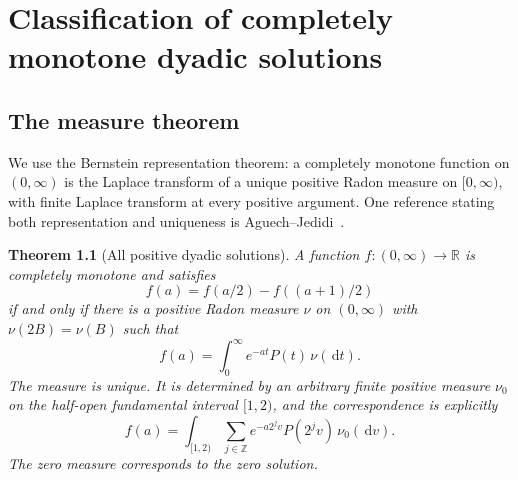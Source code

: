 \documentclass[11pt,a4paper,oneside,openany]{book}
\numberwithin{equation}{chapter}
\newtheorem{theorem}{Theorem}[chapter]
\theoremstyle{definition}
\theoremstyle{remark}
\newcommand{\Z}{\mathbb Z}
\newcommand{\R}{\mathbb R}
\newcommand{\dd}{\,\mathrm d}
\begin{document}
\chapter{Classification of completely monotone dyadic solutions}\label{ra:sec:classification}

\section{The measure theorem}
We use the Bernstein representation theorem: a completely monotone
function on $(0,\infty)$ is the Laplace transform of a unique positive
Radon measure on $[0,\infty)$, with finite Laplace transform at every
positive argument. One reference stating both representation and uniqueness
is Aguech--Jedidi~\cite[Theorem~1]{aguech-jedidi}.

\begin{theorem}[All positive dyadic solutions]\label{ra:thm:classification}
A function $f:(0,\infty)\to\R$ is completely monotone and satisfies
\begin{equation}\label{ra:eq:dyadicequation}
 f(a)=f(a/2)-f((a+1)/2)
\end{equation}
if and only if there is a positive Radon measure $\nu$ on $(0,\infty)$
with $\nu(2B)=\nu(B)$ such that
\begin{equation}\label{ra:eq:frepresent}
 f(a)=\int_0^\infty e^{-at}P(t)\,\nu(\dd t).
\end{equation}
The measure is unique. It is determined by an arbitrary finite positive
measure $\nu_0$ on the half-open fundamental interval $[1,2)$, and the
correspondence is explicitly
\begin{equation}\label{ra:eq:shellrepresentation}
 f(a)=\int_{[1,2)}\sum_{j\in\Z}
          e^{-a2^jv}P(2^jv)\,\nu_0(\dd v).
\end{equation}
The zero measure corresponds to the zero solution.
\end{theorem}
\end{document}

